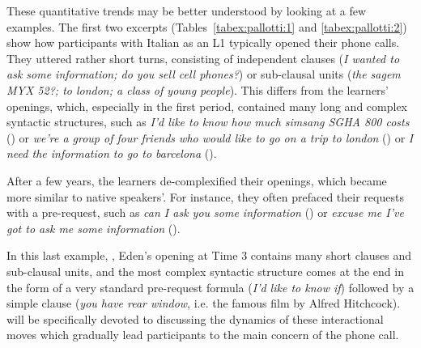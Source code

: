 \documentclass[output=paper]{langscibook}
\begin{document}
These quantitative trends may be better understood by looking at a few examples. The first two excerpts (Tables~\ref{tabex:pallotti:1} and \ref{tabex:pallotti:2}) show how participants with Italian as an L1 typically opened their phone calls. They uttered rather short turns, consisting of independent clauses (\textit{I wanted to ask some information; do you sell cell phones?}) or sub-clausal units (\textit{the sagem MYX 52?; to london;  a class of young people}). This differs from the learners’ openings, which, especially in the first period, contained many long and complex syntactic structures, such as \textit{I’d like to know how much simsang SGHA 800 costs} () or \textit{we’re a group of four friends who would like to go on a trip to london} () or \textit{I need the information to go to barcelona} ().


After a few years, the learners de-complexified their openings, which became more similar to native speakers’. For instance, they often prefaced their requests with a pre-request, such as \textit{can I ask you some information} () or \textit{excuse me I've got to ask me some information} ().

In this last example, , Eden’s opening at Time 3 contains many short clauses and sub-clausal units, and the most complex syntactic structure comes at the end in the form of a very standard pre-request formula (\textit{I’d like to know if}) followed by a simple clause (\textit{you have rear window}, i.e. the famous film by Alfred Hitchcock).  will be specifically devoted to discussing the dynamics of these interactional moves which gradually lead participants to the main concern of the phone call. 
\end{document}
